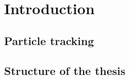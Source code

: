 \chapter{Introduction}
\label{chap:intr}

\section{Particle tracking}

\section{Structure of the thesis} %

